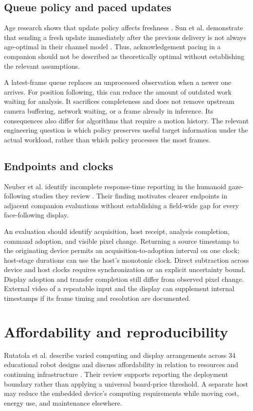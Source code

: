 \documentclass[journal]{IEEEtran}
\begin{document}
\subsection{Queue policy and paced updates}
Age research shows that update policy affects freshness \cite{yates2021}. Sun et al. demonstrate that sending a fresh update immediately after the previous delivery is not always age-optimal in their channel model \cite{sun2017}. Thus, acknowledgement pacing in a companion should not be described as theoretically optimal without establishing the relevant assumptions.

A latest-frame queue replaces an unprocessed observation when a newer one arrives. For position following, this can reduce the amount of outdated work waiting for analysis. It sacrifices completeness and does not remove upstream camera buffering, network waiting, or a frame already in inference. Its consequences also differ for algorithms that require a motion history. The relevant engineering question is which policy preserves useful target information under the actual workload, rather than which policy processes the most frames.

\subsection{Endpoints and clocks}
Neuber et al. identify incomplete response-time reporting in the humanoid gaze-following studies they review \cite{neuber2026}. Their finding motivates clearer endpoints in adjacent companion evaluations without establishing a field-wide gap for every face-following display.

An evaluation should identify acquisition, host receipt, analysis completion, command adoption, and visible pixel change. Returning a source timestamp to the originating device permits an acquisition-to-adoption interval on one clock; host-stage durations can use the host's monotonic clock. Direct subtraction across device and host clocks requires synchronization or an explicit uncertainty bound. Display adoption and transfer completion still differ from observed pixel change. External video of a repeatable input and the display can supplement internal timestamps if its frame timing and resolution are documented.

\section{Affordability and reproducibility}
Rutatola et al. describe varied computing and display arrangements across 34 educational robot designs and discuss affordability in relation to resources and continuing infrastructure \cite{rutatola2026}. Their review supports reporting the deployment boundary rather than applying a universal board-price threshold. A separate host may reduce the embedded device's computing requirements while moving cost, energy use, and maintenance elsewhere.
\end{document}
